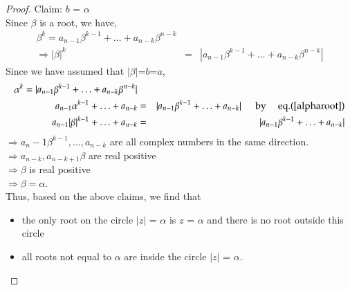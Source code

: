 \begin{multicols}{2}
\begin{proof}
Claim: $b$ = $\alpha$ \\
Since $\beta$ is a root, we have,
\begin{eqnarray}
\beta^k = a_{n-1}\beta^{k-1} + \ldots + a_{n-k}\beta^{n-k}\nonumber\\
\Rightarrow |\beta|^k &=& |a_{n-1}\beta^{k-1} + \ldots + a_{n-k}\beta^{n-k}|\nonumber
\end{eqnarray}
Since we have assumed that $|\beta|$=$b$=$a$, 
\begin{eqnarray}
\alpha^k = |a_{n-1}\beta^{k-1}+ \ldots + a_{n-k}\beta^{n-k}|\nonumber\\
a_{n-1}\alpha^{k-1}+ \ldots + a_{n-k} &=&  |a_{n-1}\beta^{k-1}+ \ldots + a_{n-k}| \hspace{0.2in}\textup{by \hspace{0.1in} eq.(\ref{alpharoot})} \\
a_{n-1}|\beta|^{k-1}+ \ldots + a_{n-k} &=&  |a_{n-1}\beta^{k-1}+ \ldots + a_{n-k}|
\end{eqnarray}
$\Rightarrow a_n-1\beta^{k-1}, \ldots, a_{n-k}$ are all complex numbers in the same direction. \\
$\Rightarrow a_{n-k}, a_{n-k+1} \beta$ are real positive\\
$\Rightarrow \beta$ is real positive\\
$\Rightarrow \beta = \alpha$.\\

Thus, based on the above claims, we find that 
\begin{itemize}
\item the only root on the circle $|z|$ = $\alpha$ is $z$ = $\alpha$ and there is no root outside this circle
\item all roots not equal to $\alpha$ are inside the circle $|z|$ = $\alpha$.
\end{itemize}


\end{proof}
\end{multicols}
